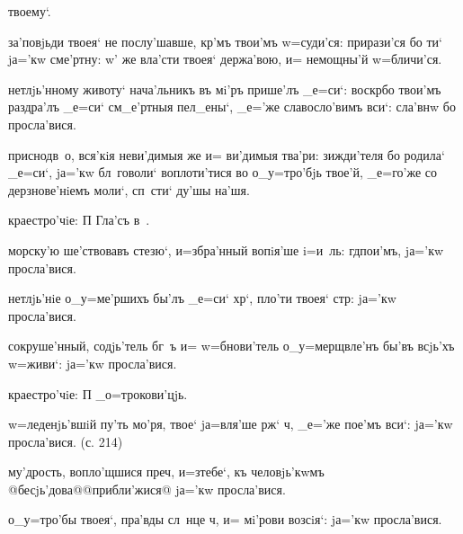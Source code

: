 твоему`.

за'повjьди твоея` не послу'шавше, кр'мъ твои'мъ 
w=суди'ся: прирази'ся бо ти` jа='кw сме'ртну: w' же 
вла'сти твоея` держа'вою, и= немощны'й w=бличи'ся.

нетлjь'нному животу` нача'льникъ въ мi'ръ прише'лъ 
_е=си`: воскр бо твои'мъ раздра'лъ _е=си` 
см_е'ртныя пел_ены`, _е='же славосло'вимъ вси`: сла'внw 
бо просла'вися.

приснодв~о, вся'кiя неви'димыя же и= ви'димыя тва'ри: 
зижди'теля бо родила` _е=си`, jа='кw бл~говоли` 
воплоти'тися во о_у=тро'бjь твое'й, _е=го'же со 
дерзнове'нiемъ моли`, сп~сти` ду'шы на'шя.

краестро'чiе: П%
Гла'съ в~.%


морску'ю ше'ствовавъ стезю`, и=збра'нный вопiя'ше i=и~ль: 
гд пои'мъ, jа='кw просла'вися.

нетлjь'нiе о_у=ме'ршихъ бы'лъ _е=си` хр`, пло'ти 
твоея` стр: jа='кw просла'вися.

сокруше'нный, содjь'тель бг~ъ и= w=бнови'тель 
о_у=мерщвле'нъ бы'въ всjь'хъ w=живи`: jа='кw просла'вися.

краестро'чiе: П%
_о=трокови'цjь.%


w=леденjь'вшiй пу'ть мо'ря, твое` jа=вля'ше рж` 
ч, _е='же пое'мъ вси`: jа='кw просла'вися. (с. 214)

му'дрость, вопло'щшися преч, и=з\ъ тебе`, къ 
человjь'кwмъ @бесjь'дова@{@прибли'жися@} jа='кw 
просла'вися.

о_у=тро'бы твоея`, пра'вды сл~нце ч, и= мi'рови 
возсiя`: jа='кw просла'вися.



